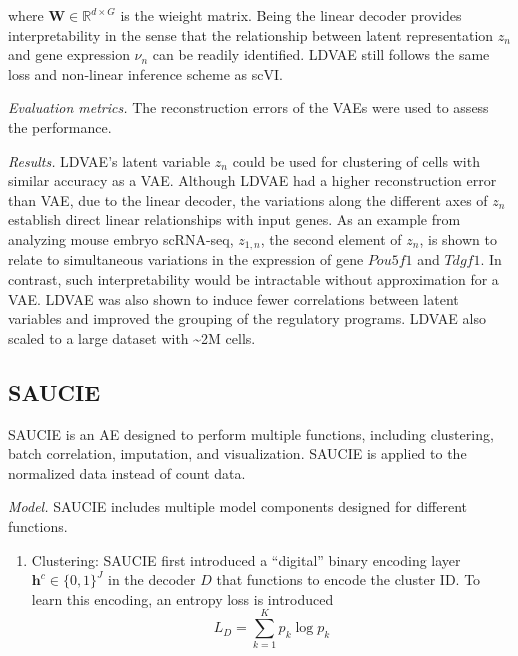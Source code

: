 \documentclass[
]{book}
\providecommand{\tightlist}{%
  \setlength{\itemsep}{0pt}\setlength{\parskip}{0pt}}
\begin{document}
where \(\mathbf{W} \in \mathbb{R}^{d×G}\) is the wieight matrix. Being the linear decoder provides interpretability in the sense that the relationship between latent representation \(z_{n}\) and gene expression \(ν_{n}\) can be readily identified. LDVAE still follows the same loss and non-linear inference scheme as scVI.

\emph{Evaluation metrics.} The reconstruction errors of the VAEs were used to assess the performance.

\emph{Results.} LDVAE's latent variable \(z_{n}\) could be used for clustering of cells with similar accuracy as a VAE. Although LDVAE had a higher reconstruction error than VAE, due to the linear decoder, the variations along the different axes of \(z_{n}\) establish direct linear relationships with input genes. As an example from analyzing mouse embryo scRNA-seq, \(z_{1,n}\), the second element of \(z_{n}\), is shown to relate to simultaneous variations in the expression of gene \(Pou5f1\) and \(Tdgf1\). In contrast, such interpretability would be intractable without approximation for a VAE. LDVAE was also shown to induce fewer correlations between latent variables and improved the grouping of the regulatory programs. LDVAE also scaled to a large dataset with \textasciitilde2M cells.

\hypertarget{ch-5-4-3}{%
\subsection{SAUCIE}\label{ch-5-4-3}}

SAUCIE \citep{RN76} is an AE designed to perform multiple functions, including clustering, batch correlation, imputation, and visualization. SAUCIE is applied to the normalized data instead of count data.

\emph{Model.} SAUCIE includes multiple model components designed for different functions.

\begin{enumerate}
\def\labelenumi{\arabic{enumi}.}
\tightlist
\item
  Clustering: SAUCIE first introduced a ``digital'' binary encoding layer \(\mathbf{h}^{c} \in \{0,1\}^{J}\) in the decoder \(D\) that functions to encode the cluster ID. To learn this encoding, an entropy loss is introduced
  \begin{equation}
  L_{D} = \sum_{k=1}^{K}p_{k}\log{p_{k}} \label{eq:eq37}
  \end{equation}
\end{enumerate}
\end{document}
